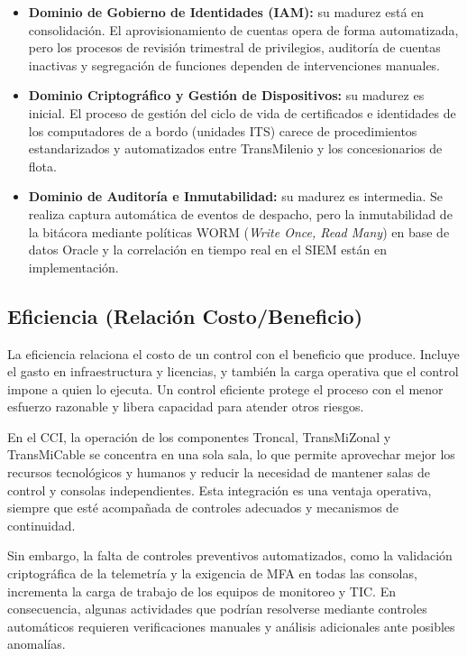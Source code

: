 \begin{itemize}
	\item \textbf{Dominio de Gobierno de Identidades (IAM):} su madurez está en consolidación. El aprovisionamiento de cuentas opera de forma automatizada, pero los procesos de revisión trimestral de privilegios, auditoría de cuentas inactivas y segregación de funciones dependen de intervenciones manuales.
	\item \textbf{Dominio Criptográfico y Gestión de Dispositivos:} su madurez es inicial. El proceso de gestión del ciclo de vida de certificados e identidades de los computadores de a bordo (unidades ITS) carece de procedimientos estandarizados y automatizados entre TransMilenio y los concesionarios de flota.
	\item \textbf{Dominio de Auditoría e Inmutabilidad:} su madurez es intermedia. Se realiza captura automática de eventos de despacho, pero la inmutabilidad de la bitácora mediante políticas WORM (\textit{Write Once, Read Many}) en base de datos Oracle y la correlación en tiempo real en el SIEM están en implementación.
\end{itemize}

\subsection{Eficiencia (Relación Costo/Beneficio)}
\label{sec:eficiencia}

La eficiencia relaciona el costo de un control con el beneficio que produce. Incluye el gasto en infraestructura y licencias, y también la carga operativa que el control impone a quien lo ejecuta. Un control eficiente protege el proceso con el menor esfuerzo razonable y libera capacidad para atender otros riesgos.

En el CCI, la operación de los componentes Troncal, TransMiZonal y TransMiCable se concentra en una sola sala, lo que permite aprovechar mejor los recursos tecnológicos y humanos y reducir la necesidad de mantener salas de control y consolas independientes. Esta integración es una ventaja operativa, siempre que esté acompañada de controles adecuados y mecanismos de continuidad.

Sin embargo, la falta de controles preventivos automatizados, como la validación criptográfica de la telemetría y la exigencia de MFA en todas las consolas, incrementa la carga de trabajo de los equipos de monitoreo y TIC. En consecuencia, algunas actividades que podrían resolverse mediante controles automáticos requieren verificaciones manuales y análisis adicionales ante posibles anomalías.

